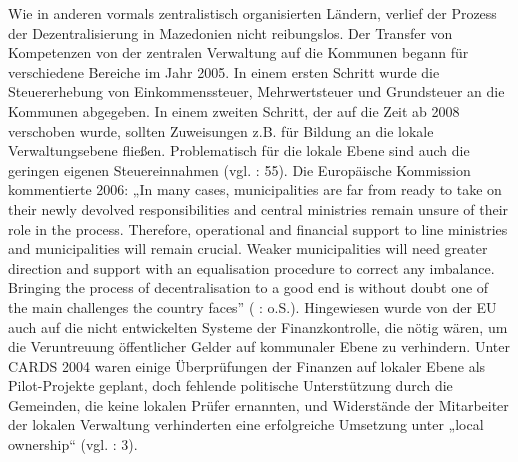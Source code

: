 Wie in anderen vormals zentralistisch organisierten Ländern, verlief der Prozess der Dezentralisierung in Mazedonien nicht reibungslos. Der Transfer von Kompetenzen von der zentralen Verwaltung auf die Kommunen begann für verschiedene Bereiche im Jahr 2005. In einem ersten Schritt wurde die Steuererhebung von Einkommenssteuer, Mehrwertsteuer und Grundsteuer an die Kommunen abgegeben. In einem zweiten Schritt, der auf die Zeit ab 2008 verschoben wurde, sollten Zuweisungen z.B. für Bildung an die lokale Verwaltungsebene fließen. Problematisch für die lokale Ebene sind auch die geringen eigenen Steuereinnahmen (vgl. \cite{repofmac12} : 55). Die Europäische Kommission kommentierte 2006: „In many cases, municipalities are far from ready to take on their newly devolved responsibilities and central ministries remain unsure of their role in the process. Therefore, operational and financial support to line ministries and municipalities will remain crucial. Weaker municipalities will need greater direction and support with an equalisation procedure to correct any imbalance. Bringing the process of decentralisation to a good end is without doubt one of the main challenges the country faces” (\cite{ear} : o.S.). Hingewiesen wurde von der EU auch auf die nicht entwickelten Systeme der Finanzkontrolle, die nötig wären, um die Veruntreuung öffentlicher Gelder auf kommunaler Ebene zu verhindern. Unter CARDS 2004 waren einige Überprüfungen der Finanzen auf lokaler Ebene als Pilot-Projekte geplant, doch fehlende politische Unterstützung durch die Gemeinden, die keine lokalen Prüfer ernannten, und Widerstände der Mitarbeiter der lokalen Verwaltung verhinderten eine erfolgreiche Umsetzung unter „local ownership“ (vgl. \cite{eurcom06a} : 3).

